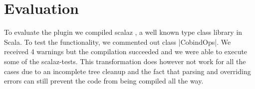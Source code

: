 \section{Evaluation}

To evaluate the plugin we compiled scalaz \cite{scalaz}, a well known type class library in Scala. To test the functionality, we commented out class |CobindOps|. We received 4 warnings but the compilation succeeded and we were able to execute some of the scalaz-tests. This transformation does however not work for all the cases due to an incomplete tree cleanup and the fact that parsing and overriding errors can still prevent the code from being compiled all the way.\\[-0.5em]